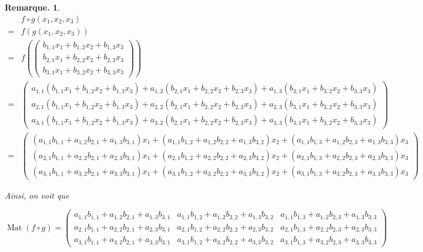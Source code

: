 \documentclass[12pt]{article}
\theoremstyle{break}
\newtheorem*{remark}{Remarque.}
\begin{document}
\begin{remark}
$$
\begin{aligned}
& f \circ g\left(x_{1}, x_{2}, x_{3}\right) \\
= & f\left(g\left(x_{1}, x_{2}, x_{3}\right)\right) \\
= & f\left(\left(\begin{array}{l}
b_{1,1} x_{1}+b_{1,2} x_{2}+b_{1,3} x_{3} \\
b_{2,1} x_{1}+b_{2,2} x_{2}+b_{2,3} x_{3} \\
b_{3,1} x_{1}+b_{3,2} x_{2}+b_{3,3} x_{3}
\end{array}\right)\right) \\
= & \left(\begin{array}{l}
a_{1,1}\left(b_{1,1} x_{1}+b_{1,2} x_{2}+b_{1,3} x_{3}\right)+a_{1,2}\left(b_{2,1} x_{1}+b_{2,2} x_{2}+b_{2,3} x_{3}\right)+a_{1,3}\left(b_{3,1} x_{1}+b_{3,2} x_{2}+b_{3,3} x_{3}\right) \\
a_{2,1}\left(b_{1,1} x_{1}+b_{1,2} x_{2}+b_{1,3} x_{3}\right)+a_{2,2}\left(b_{2,1} x_{1}+b_{2,2} x_{2}+b_{2,3} x_{3}\right)+a_{2,3}\left(b_{3,1} x_{1}+b_{3,2} x_{2}+b_{3,3} x_{3}\right) \\
a_{3,1}\left(b_{1,1} x_{1}+b_{1,2} x_{2}+b_{1,3} x_{3}\right)+a_{3,2}\left(b_{2,1} x_{1}+b_{2,2} x_{2}+b_{2,3} x_{3}\right)+a_{3,3}\left(b_{3,1} x_{1}+b_{3,2} x_{2}+b_{3,3} x_{3}\right)
\end{array}\right) \\
= & \left(\begin{array}{l}
\left(a_{1,1} b_{1,1}+a_{1,2} b_{2,1}+a_{1,3} b_{3,1}\right) x_{1}+\left(a_{1,1} b_{1,2}+a_{1,2} b_{2,2}+a_{1,3} b_{3,2}\right) x_{2}+\left(a_{1,1} b_{1,3}+a_{1,2} b_{2,3}+a_{1,3} b_{3,3}\right) x_{3} \\
\left(a_{2,1} b_{1,1}+a_{2,2} b_{2,1}+a_{2,3} b_{3,1}\right) x_{1}+\left(a_{2,1} b_{1,2}+a_{2,2} b_{2,2}+a_{2,3} b_{3,2}\right) x_{2}+\left(a_{2,1} b_{1,3}+a_{2,2} b_{2,3}+a_{2,3} b_{3,3}\right) x_{3} \\
\left(a_{3,1} b_{1,1}+a_{3,2} b_{2,1}+a_{3,3} b_{3,1}\right) x_{1}+\left(a_{3,1} b_{1,2}+a_{3,2} b_{2,2}+a_{3,3} b_{3,2}\right) x_{2}+\left(a_{3,1} b_{1,3}+a_{3,2} b_{2,3}+a_{3,3} b_{3,3}\right) x_{3}
\end{array}\right)
\end{aligned}
$$

Ainsi, on voit que

$$
\operatorname{Mat}(f \circ g)=\left(\begin{array}{lll}
a_{1,1} b_{1,1}+a_{1,2} b_{2,1}+a_{1,3} b_{3,1} & a_{1,1} b_{1,2}+a_{1,2} b_{2,2}+a_{1,3} b_{3,2} & a_{1,1} b_{1,3}+a_{1,2} b_{2,3}+a_{1,3} b_{3,3} \\
a_{2,1} b_{1,1}+a_{2,2} b_{2,1}+a_{2,3} b_{3,1} & a_{2,1} b_{1,2}+a_{2,2} b_{2,2}+a_{2,3} b_{3,2} & a_{2,1} b_{1,3}+a_{2,2} b_{2,3}+a_{2,3} b_{3,3} \\
a_{3,1} b_{1,1}+a_{3,2} b_{2,1}+a_{3,3} b_{3,1} & a_{3,1} b_{1,2}+a_{3,2} b_{2,2}+a_{3,3} b_{3,2} & a_{3,1} b_{1,3}+a_{3,2} b_{2,3}+a_{3,3} b_{3,3}
\end{array}\right)
$$
\end{remark}
\end{document}
